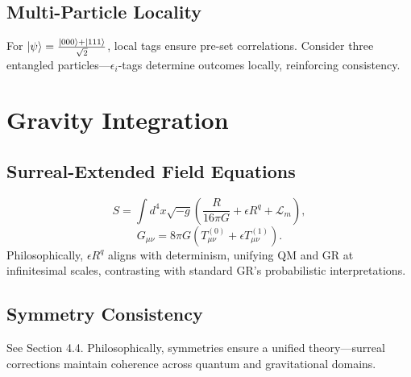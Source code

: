 \documentclass{article}
\begin{document}
\subsection{Multi-Particle Locality}
For \(\ket{\psi} = \frac{\ket{000} + \ket{111}}{\sqrt{2}}\), local tags ensure pre-set correlations. Consider three entangled particles—\(\epsilon_i\)-tags determine outcomes locally, reinforcing consistency.

\section{Gravity Integration}
\subsection{Surreal-Extended Field Equations}
\begin{equation}
S = \int d^4x \sqrt{-g} \left( \frac{R}{16\pi G} + \epsilon R^q + \mathcal{L}_m \right),
\end{equation}
\begin{equation}
G_{\mu\nu} = 8\pi G \left( T_{\mu\nu}^{(0)} + \epsilon T_{\mu\nu}^{(1)} \right).
\end{equation}
Philosophically, \(\epsilon R^q\) aligns with determinism, unifying QM and GR at infinitesimal scales, contrasting with standard GR's probabilistic interpretations.

\subsection{Symmetry Consistency}
See Section 4.4. Philosophically, symmetries ensure a unified theory—surreal corrections maintain coherence across quantum and gravitational domains.
\end{document}
